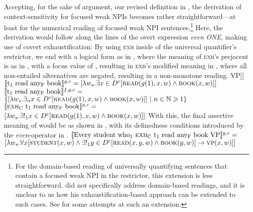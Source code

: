 Accepting, for the sake of argument, our revised definition in , the derivation of context-sensitivity for focused weak NPIs becomes rather straightforward---at least for the numerical reading of focused weak NPI sentences.\footnote{For the domain-based reading of universally quantifying sentences that contain a focused weak NPI in the restrictor, this extension is less straightforward. \textcite{Crnic2014-dogma} did not specifically address domain-based readings, and it is unclear to us how his exhaustification-based approach can be extended to such cases. See  for some attempts at such an extension.} Here, the derivation would follow along the lines of the overt expression \textit{even \MakeUppercase{one}}, making use of covert exhaustification: By using {\scshape exh} inside of the universal quantifier's restrictor, we end with a logical form as in , where the meaning of {\scshape exh}'s prejacent is as in , with a focus value of , resulting in {\scshape exh}'s modified meaning in , where all non-entailed alternatives are negated, resulting in a non-monotone reading.
\pex
\a[] [even\textsubscript{C'} [every student wh\textsubscript{1} [{\scshape exh}\textsubscript{C} t\textsubscript{1} read any\textsubscript{F} book] VP]]
\a $\intension[g,c]{t\textsubscript{1} read any\textsubscript{F} book}=[\lambda{w_s}.\exists{x\in{D^c}}[\predicate{read}(g(1),x,w)\land\predicate{book}(x,w)]]$
\a $\intension[f,g,c]{t\textsubscript{1} read any\textsubscript{F} book}=$\\\emptyfill$\{[\lambda{w_s}.\exists_n{x\in{D^c}}[\predicate{read}(g(1),x,w)\land\predicate{book}(x,w)]]~|~n\in\mathbb{N}\geqslant1\}$
\a $\intension[g,c]{{\scshape exh}\textsubscript{C} t\textsubscript{1} read any\textsubscript{F} book}=$\\\emptyfill$[\lambda{w_s}.\exists!_1{x\in{D^c}}[\predicate{read}(g(1),x,w)\land\predicate{book}(x,w)]]$
\xe
With this, the final assertive meaning of  would be as shown in , with its definedness conditions introduced by the \textit{even}-operator in .
\ex
$\intension[g,c]{Every student who\textsubscript{1} {\scshape exh}\textsubscript{C} t\textsubscript{1} read any\textsubscript{F} book VP}=$\\\emptyfill$[\lambda{w_s}.\forall{x}[\predicate{student}(x,w)\land\exists!_1{y\in{D^c}}[\predicate{read}(x,y,w)\land\predicate{book}(y,w)]\rightarrow\predicate{vp}(x,w)]]$
